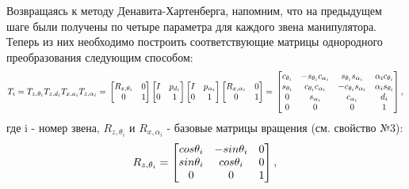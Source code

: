 \hspace*{\parindent} Возвращаясь к методу Денавита-Хартенберга, напомним, что на предыдущем шаге были получены по четыре параметра для каждого звена манипулятора. Теперь из них необходимо построить соответствующие матрицы однородного преобразования следующим способом:\\
\begin{equation*}\label{eq:model}
T_i = T_{z,{\theta_i}} T_{z,{d_i}} T_{x,{a_i}} T_{z,{\alpha_i}} = \\
     \begin{bmatrix}
      R_{z,{\theta_i}} & 0\\
      0 & 1 \\
    \end{bmatrix}
    \begin{bmatrix}
      I & p_{d_i}\\
      0 & 1 \\
    \end{bmatrix}
    \begin{bmatrix}
      I & p_{\alpha_i}\\
      0 & 1 \\
    \end{bmatrix}
    \begin{bmatrix}
      R_{x,{\alpha_i}} & 0\\
      0 & 1 \\
    \end{bmatrix}
    = \\
     \begin{bmatrix}
      c_{\theta_i} & -s_{\theta_i}c_{\alpha_i} & s_{\theta_i}s_{\alpha_i} & \alpha_i c_{\theta_i} \\
      s_{\theta_i} & c_{\theta_i}c_{\alpha_i} & -c_{\theta_i}s_{\alpha_i} & \alpha_i s_{\theta_i} \\
      0 & s_{\alpha_i} & c_{\alpha_i} & d_i\\
      0 & 0 & 0 & 1\\
    \end{bmatrix}
    ,\\
\end{equation*} 
\hspace*{\parindent}где i - номер звена,  $R_{z,{\theta_i}}$ и $R_{x,{\alpha_i}}$  - базовые матрицы вращения (см. свойство №3):
\begin{equation*}\label{eq:model}
R_{z, \theta_i} = 
     \begin{bmatrix}
    cos\theta_i & -sin\theta_i & 0\\
    sin\theta_i & cos\theta_i & 0\\
    0 & 0 & 1\\
    \end{bmatrix}
    , \\
\end{equation*} 

